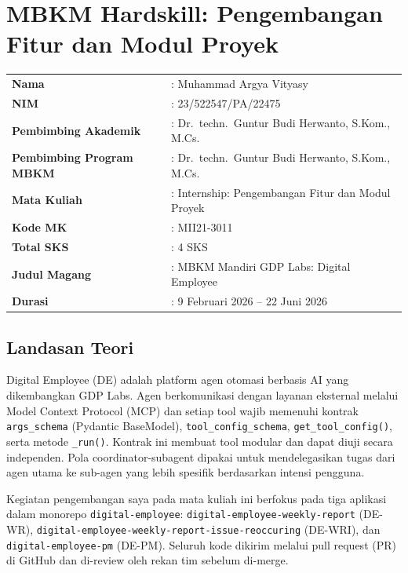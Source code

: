 \section{MBKM Hardskill: Pengembangan Fitur dan Modul Proyek}

\begin{table}[H]
    \centering
    \begin{tabular}{ll}
        \textbf{Nama} & : Muhammad Argya Vityasy \\
        \textbf{NIM} & : 23/522547/PA/22475 \\
        \textbf{Pembimbing Akademik} & : Dr.\ techn.\ Guntur Budi Herwanto, S.Kom., M.Cs. \\
        \textbf{Pembimbing Program MBKM} & : Dr.\ techn.\ Guntur Budi Herwanto, S.Kom., M.Cs. \\
        \textbf{Mata Kuliah} & : Internship: Pengembangan Fitur dan Modul Proyek \\
        \textbf{Kode MK} & : MII21-3011 \\
        \textbf{Total SKS} & : 4 SKS \\
        \textbf{Judul Magang} & : MBKM Mandiri GDP Labs: Digital Employee \\
        \textbf{Durasi} & : 9 Februari 2026 -- 22 Juni 2026 \\
    \end{tabular}
\end{table}

\subsection{Landasan Teori}

Digital Employee (DE) adalah platform agen otomasi berbasis AI yang dikembangkan GDP Labs. Agen berkomunikasi dengan layanan eksternal melalui Model Context Protocol (MCP) dan setiap tool wajib memenuhi kontrak \texttt{args\_schema} (Pydantic BaseModel), \texttt{tool\_config\_schema}, \texttt{get\_tool\_config()}, serta metode \texttt{\_run()}. Kontrak ini membuat tool modular dan dapat diuji secara independen. Pola coordinator-subagent dipakai untuk mendelegasikan tugas dari agen utama ke sub-agen yang lebih spesifik berdasarkan intensi pengguna.

Kegiatan pengembangan saya pada mata kuliah ini berfokus pada tiga aplikasi dalam monorepo \texttt{digital-employee}: \texttt{digital-employee-weekly-report} (DE-WR), \texttt{digital-employee-weekly-report-issue-reoccuring} (DE-WRI), dan \texttt{digital-employee-pm} (DE-PM). Seluruh kode dikirim melalui pull request (PR) di GitHub dan di-review oleh rekan tim sebelum di-merge.

